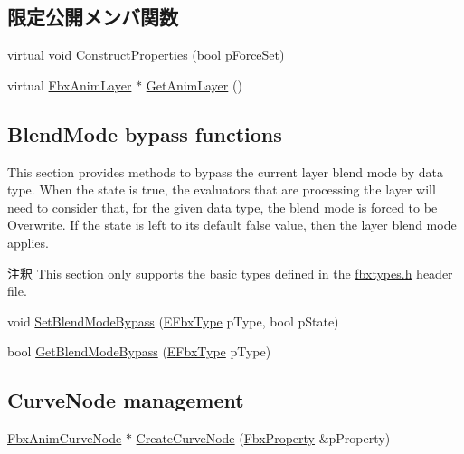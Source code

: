 \subsection*{限定公開メンバ関数}
\begin{DoxyCompactItemize}
\item 
virtual void \hyperlink{class_fbx_anim_layer_a24afc26df98e56c965c0c60e637ed888}{Construct\+Properties} (bool p\+Force\+Set)
\item 
virtual \hyperlink{class_fbx_anim_layer}{Fbx\+Anim\+Layer} $\ast$ \hyperlink{class_fbx_anim_layer_ab031a979290c44d59ae3ba25a4ab2169}{Get\+Anim\+Layer} ()
\end{DoxyCompactItemize}
\subsection*{Blend\+Mode bypass functions}
\label{_amgrp69dcbe1ac0f20ac1568a8b5ca4119588}%
This section provides methods to bypass the current layer blend mode by data type. When the state is {\ttfamily true}, the evaluators that are processing the layer will need to consider that, for the given data type, the blend mode is forced to be Overwrite. If the state is left to its default {\ttfamily false} value, then the layer blend mode applies. \begin{DoxyRemark}{注釈}
This section only supports the basic types defined in the \hyperlink{fbxtypes_8h}{fbxtypes.\+h} header file. 
\end{DoxyRemark}
\begin{DoxyCompactItemize}
\item 
void \hyperlink{class_fbx_anim_layer_a8be5d3511971847c8f8d88c0a9fe2158}{Set\+Blend\+Mode\+Bypass} (\hyperlink{fbxpropertytypes_8h_a73913a5ddfb20e57c6f25e9e6784bd92}{E\+Fbx\+Type} p\+Type, bool p\+State)
\item 
bool \hyperlink{class_fbx_anim_layer_a3f16ece7c4506b8d72c2b77db5e81586}{Get\+Blend\+Mode\+Bypass} (\hyperlink{fbxpropertytypes_8h_a73913a5ddfb20e57c6f25e9e6784bd92}{E\+Fbx\+Type} p\+Type)
\end{DoxyCompactItemize}
\subsection*{Curve\+Node management}
\begin{DoxyCompactItemize}
\item 
\hyperlink{class_fbx_anim_curve_node}{Fbx\+Anim\+Curve\+Node} $\ast$ \hyperlink{class_fbx_anim_layer_a634a9dd8c4a0a7457a15d50f9643d4e0}{Create\+Curve\+Node} (\hyperlink{class_fbx_property}{Fbx\+Property} \&p\+Property)
\end{DoxyCompactItemize}
